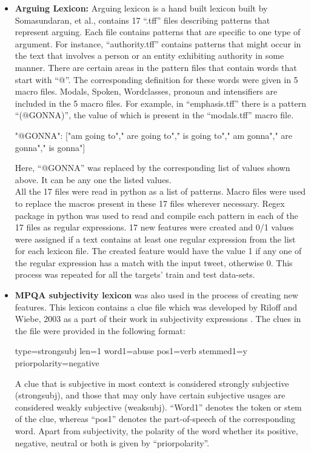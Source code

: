 \documentclass[9pt,twocolumn,twoside]{../../styles/osajnl}
\begin{document}
\begin{itemize}
\item{\textbf{Arguing Lexicon:}
Arguing lexicon \cite{somasundaran2007detecting} is a hand built lexicon built by Somasundaran, et al., contains 17 “.tff” files describing patterns that represent arguing. Each file contains patterns that are specific to one type of argument. For instance, “authority.tff” contains patterns that might occur in the text that involves a person or an entity exhibiting authority in some manner. There are certain areas in the pattern files that contain words that start with “@”. The corresponding definition for these words were given in 5 macro files. Modals, Spoken, Wordclasses, pronoun and intensifiers are included in the 5 macro files. For example, in “emphasis.tff” there is a pattern “(@GONNA)”, the value of which is present in the “modals.tff” macro file. 
\begin{center}
"@GONNA": ["am going to"," are going to"," is going to"," am gonna"," are gonna"," is gonna"]
\end{center}
Here, “@GONNA” was replaced by the corresponding list of values shown above. It can be any one the listed values. \\
All the 17 files were read in python as a list of patterns. Macro files were used to replace the macros present in these 17 files wherever necessary. Regex package in python was used to read and compile each pattern in each of the 17 files as regular expressions. 17 new features were created and 0/1 values were assigned if a text contains at least one regular expression from the list for each lexicon file. The created feature would have the value 1 if any one of the regular expression has a match with the input tweet, otherwise 0. This process was repeated for all the targets’ train and test data-sets.}

\item{\textbf{MPQA subjectivity lexicon} was also used in the process of creating new features. This lexicon contains a clue file which was developed by Riloff and Wiebe, 2003 as a part of their work in subjectivity expressions \cite{riloff2003learning}. The clues in the file were provided in the following format:
\begin{center}
type=strongsubj len=1 word1=abuse pos1=verb stemmed1=y priorpolarity=negative
\end{center}
A clue that is subjective in most context is considered strongly subjective (strongsubj), and those that may only have certain subjective usages are considered weakly subjective (weaksubj). “Word1” denotes the token or stem of the clue, whereas “pos1” denotes the part-of-speech of the corresponding word. Apart from subjectivity, the polarity of the word whether its positive, negative, neutral or both is given by “priorpolarity”.}
\end{itemize}
\end{document}
